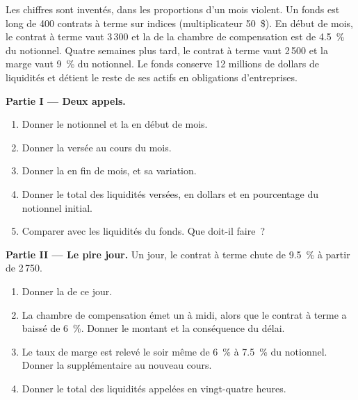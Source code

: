 \begin{problem}\label{pb:m1:margin:1}
Les chiffres sont inventés, dans les proportions d'un mois violent. Un fonds est
long de 400 contrats à terme sur indices (multiplicateur 50~\$). En début de mois, le
contrat à terme vaut 3\,300 et la  de la chambre de compensation est de 4.5~\% du
notionnel. Quatre semaines plus tard, le contrat à terme vaut 2\,500 et la marge vaut 9~\% du
notionnel. Le fonds conserve 12 millions de dollars de liquidités et détient le reste de ses
actifs en obligations d'entreprises.

\medskip\noindent\textbf{Partie I --- Deux appels.}
\begin{enumerate}
\item Donner le notionnel et la  en début de mois.
\item Donner la  versée au cours du mois.
\item Donner la  en fin de mois, et sa variation.
\item Donner le total des liquidités versées, en dollars et en pourcentage du
notionnel initial.
\item Comparer avec les liquidités du fonds. Que doit-il faire~?
\end{enumerate}

\medskip\noindent\textbf{Partie II --- Le pire jour.}
Un jour, le contrat à terme chute de 9.5~\% à partir de 2\,750.
\begin{enumerate}[resume]
\item Donner la  de ce jour.
\item La chambre de compensation émet un  à midi, alors que le contrat à terme
a baissé de 6~\%. Donner le montant et la conséquence du délai.
\item Le taux de marge est relevé le soir même de 6~\% à 7.5~\% du notionnel. Donner la 
supplémentaire au nouveau cours.
\item Donner le total des liquidités appelées en vingt-quatre heures.
\end{enumerate}


\end{problem}
